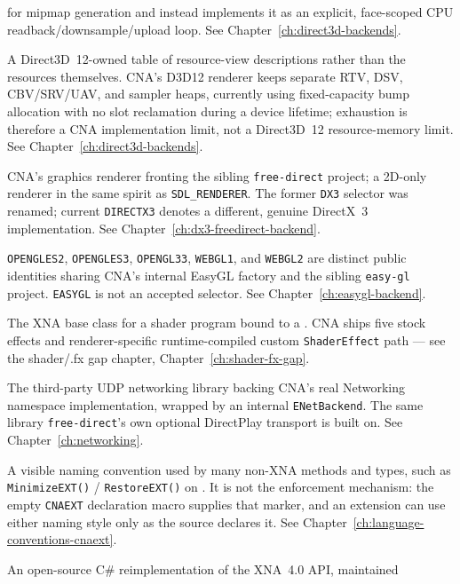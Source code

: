\begin{description}
  for mipmap generation and instead implements it as an explicit, face-scoped CPU
  readback/downsample/upload loop. See Chapter~\ref{ch:direct3d-backends}.
\item[Descriptor heap] A Direct3D~12-owned table of resource-view descriptions rather than the
  resources themselves. CNA's D3D12 renderer keeps separate RTV, DSV, CBV/SRV/UAV, and sampler
  heaps, currently using fixed-capacity bump allocation with no slot reclamation during a device
  lifetime; exhaustion is therefore a CNA implementation limit, not a Direct3D~12 resource-memory
  limit. See Chapter~\ref{ch:direct3d-backends}.
\item[FREEDIRECT] CNA's graphics renderer fronting the sibling \texttt{free-direct} project;
  a 2D-only renderer in the same spirit as \texttt{SDL\_RENDERER}. The former \texttt{DX3}
  selector was renamed; current \texttt{DIRECTX3} denotes a different, genuine DirectX~3
  implementation. See Chapter~\ref{ch:dx3-freedirect-backend}.
\item[EasyGL profiles] \texttt{OPENGLES2}, \texttt{OPENGLES3}, \texttt{OPENGL33},
  \texttt{WEBGL1}, and \texttt{WEBGL2} are distinct public identities sharing CNA's internal
  EasyGL factory and the sibling \texttt{easy-gl} project. \texttt{EASYGL} is not an accepted
  selector. See Chapter~\ref{ch:easygl-backend}.
\item[Effect] The XNA base class for a shader program bound to a .
  CNA ships five stock effects and renderer-specific runtime-compiled custom
  \texttt{ShaderEffect} path --- see the shader/.fx gap chapter, Chapter~\ref{ch:shader-fx-gap}.
\item[ENet] The third-party UDP networking library backing CNA's real Networking
  namespace implementation, wrapped by an internal \texttt{ENetBackend}. The same library
  \texttt{free-direct}'s own optional DirectPlay transport is built on. See Chapter~\ref{ch:networking}.
\item[\texttt{EXT} suffix] A visible naming convention used by many non-XNA methods and types,
  such as \texttt{MinimizeEXT()} / \texttt{RestoreEXT()} on . It is not the
  enforcement mechanism: the empty \texttt{CNAEXT} declaration macro supplies that marker, and
  an extension can use either naming style only as the source declares it. See
  Chapter~\ref{ch:language-conventions-cnaext}.
\item[FNA] An open-source C\# reimplementation of the XNA~4.0 API, maintained

\end{description}
